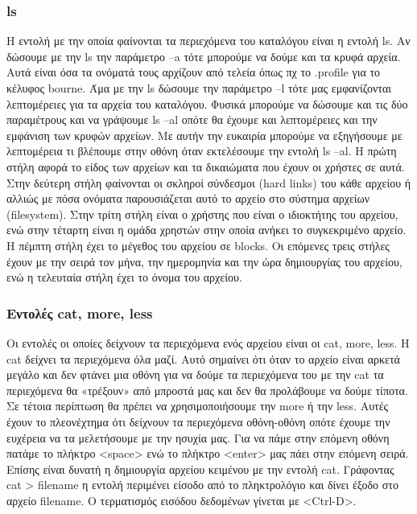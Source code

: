 \subsubsection{ls}
Η εντολή με την οποία φαίνονται τα περιεχόμενα του καταλόγου είναι η εντολή ls.
Αν δώσουμε με την ls την παράμετρο –a τότε μπορούμε να δούμε και τα κρυφά αρχεία. Αυτά είναι όσα τα ονόματά τους αρχίζουν από τελεία όπως πχ το .profile για το κέλυφος bourne. Άμα με την ls δώσουμε την παράμετρο –l τότε μας εμφανίζονται λεπτομέρειες για τα αρχεία του καταλόγου. Φυσικά μπορούμε να δώσουμε και τις δύο παραμέτρους και να γράψουμε ls –al οπότε θα έχουμε και λεπτομέρειες και την
εμφάνιση των κρυφών αρχείων. Με αυτήν την ευκαιρία μπορούμε να εξηγήσουμε με
λεπτομέρεια τι βλέπουμε στην οθόνη όταν εκτελέσουμε την εντολή ls –al.
Η πρώτη στήλη αφορά το είδος των αρχείων και τα δικαιώματα που έχουν οι χρήστες
σε αυτά. Στην δεύτερη στήλη φαίνονται οι σκληροί σύνδεσμοι (hard links) του κάθε
αρχείου ή αλλιώς με πόσα ονόματα παρουσιάζεται αυτό το αρχείο στο σύστημα
αρχείων (filesystem). Στην τρίτη στήλη είναι ο χρήστης που είναι ο ιδιοκτήτης του
αρχείου, ενώ στην τέταρτη είναι η ομάδα χρηστών στην οποία ανήκει το
συγκεκριμένο αρχείο. Η πέμπτη στήλη έχει το μέγεθος του αρχείου σε blocks. Οι
επόμενες τρεις στήλες έχουν με την σειρά τον μήνα, την ημερομηνία και την ώρα
δημιουργίας του αρχείου, ενώ η τελευταία στήλη έχει το όνομα του αρχείου.

\subsubsection{Εντολές cat, more, less}

Οι εντολές οι οποίες δείχνουν τα περιεχόμενα ενός αρχείου είναι οι cat, more, less. Η
cat δείχνει τα περιεχόμενα όλα μαζί. Αυτό σημαίνει ότι όταν το αρχείο είναι αρκετά
μεγάλο και δεν φτάνει μια οθόνη για να δούμε τα περιεχόμενα του με την cat τα
περιεχόμενα θα «τρέξουν» από μπροστά μας και δεν θα προλάβουμε να δούμε τίποτα.
Σε τέτοια περίπτωση θα πρέπει να χρησιμοποιήσουμε την more ή την less. Αυτές
έχουν το πλεονέχτημα ότι δείχνουν τα περιεχόμενα οθόνη-οθόνη οπότε έχουμε την
ευχέρεια να τα μελετήσουμε με την ησυχία μας. Για να πάμε στην επόμενη οθόνη
πατάμε το πλήκτρο <space> ενώ το πλήκτρο <enter> μας πάει στην επόμενη σειρά.
Επίσης είναι δυνατή η δημιουργία αρχείου κειμένου με την εντολή cat. Γράφοντας
cat > filename η εντολή περιμένει είσοδο από το πληκτρολόγιο και δίνει έξοδο στο
αρχείο filename. Ο τερματισμός εισόδου δεδομένων γίνεται με <Ctrl-D>.

